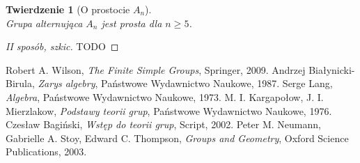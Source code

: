 \documentclass[licencjacka]{pracamgr}
\newtheorem{thh}{Twierdzenie}[section]
\begin{document}
\addtocounter{chapter}{-2}

\begin{thh}[O prostocie $A_n$] $ $ \\
    Grupa alternująca $A_n$ jest prosta dla $n \ge 5$.
\end{thh}
\begin{proof}[II sposób, szkic]
  TODO %
\end{proof}


\addtocounter{chapter}{2}


\begin{thebibliography}{99}

 Robert A. Wilson, \textit{The Finite Simple Groups}, Springer, 2009.
 Andrzej Białynicki-Birula, \textit{Zarys algebry}, Państwowe Wydawnictwo Naukowe, 1987.
 Serge Lang, \textit{Algebra}, Państwowe Wydawnictwo Naukowe, 1973.
 M. I. Kargapołow, J. I. Mierzlakow, \textit{Podstawy teorii grup}, Państwowe Wydawnictwo Naukowe, 1976.
 Czesław Bagiński, \textit{Wstęp do teorii grup}, Script, 2002.
 Peter M. Neumann, Gabrielle A. Stoy, Edward C. Thompson, \textit{Groups and Geometry}, Oxford Science Publications, 2003.

\end{thebibliography}
\end{document}
